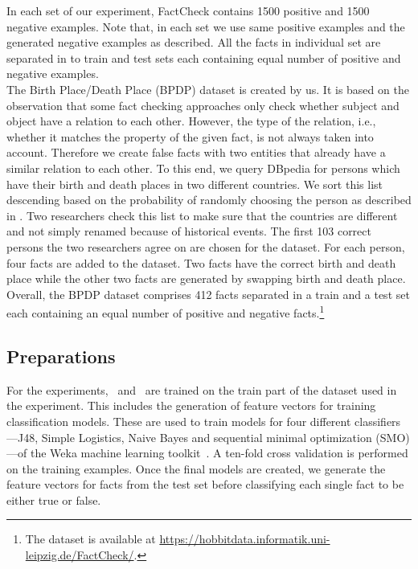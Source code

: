 In each set of our experiment, FactCheck contains 1500 positive and 1500 negative examples. Note that, in each set we use same positive examples and the generated negative examples as described. All the facts in individual set are separated in to train and test sets each containing equal number of positive and negative examples. \\

The Birth Place/Death Place (BPDP) dataset is created by us. It is based on the observation that some fact checking approaches only check whether subject and object have a relation to each other. However, the type of the relation, i.e., whether it matches the property of the given fact, is not always taken into account. Therefore we create false facts with two entities that already have a similar relation to each other. To this end, we query DBpedia for persons which have their birth and death places in two different countries. We sort this list descending based on the probability of randomly choosing the person as described in \cite{Hare2017}. Two researchers check this list to make sure that the countries are different and not simply renamed because of historical events. The first 103 correct persons the two researchers agree on are chosen for the dataset. For each person, four facts are added to the dataset. Two facts have the correct birth and death place while the other two facts are generated by swapping birth and death place. Overall, the BPDP dataset comprises 412 facts separated in a train and a test set each containing an equal number of positive and negative facts.\footnote{The dataset is available at \url{https://hobbitdata.informatik.uni-leipzig.de/FactCheck/}.}

\subsection{Preparations}

For the experiments, \DeFacto\ and \FactCheck\ are trained on the train part of the dataset used in the experiment. This includes the generation of feature vectors for training classification models. These are used to train models for four different classifiers---J48, Simple Logistics, Naive Bayes and sequential minimal optimization (SMO)---of the Weka machine learning toolkit~\cite{weka2016}. A ten-fold cross validation is performed on the training examples. Once the final models are created, we generate the feature vectors for facts from the test set before classifying each single fact to be either true or false.

